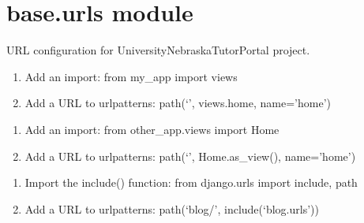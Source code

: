 \documentclass[letterpaper,10pt,english]{sphinxmanual}
\begin{document}
\section{base.urls module}
\label{\detokenize{settings/settings:module-base.urls}}\label{\detokenize{settings/settings:base-urls-module}}
\sphinxAtStartPar
URL configuration for University\sphinxhyphen{}Nebraska\sphinxhyphen{}Tutor\sphinxhyphen{}Portal project.
\begin{description}
\sphinxAtStartPar
{}

\begin{enumerate}
%
\item {} 
\sphinxAtStartPar
Add an import:  from my\_app import views

\item {} 
\sphinxAtStartPar
Add a URL to urlpatterns:  path(‘’, views.home, name=’home’)

\end{enumerate}

\begin{enumerate}
%
\item {} 
\sphinxAtStartPar
Add an import:  from other\_app.views import Home

\item {} 
\sphinxAtStartPar
Add a URL to urlpatterns:  path(‘’, Home.as\_view(), name=’home’)

\end{enumerate}

\begin{enumerate}
%
\item {} 
\sphinxAtStartPar
Import the include() function: from django.urls import include, path

\item {} 
\sphinxAtStartPar
Add a URL to urlpatterns:  path(‘blog/’, include(‘blog.urls’))

\end{enumerate}

\end{description}
\end{document}
